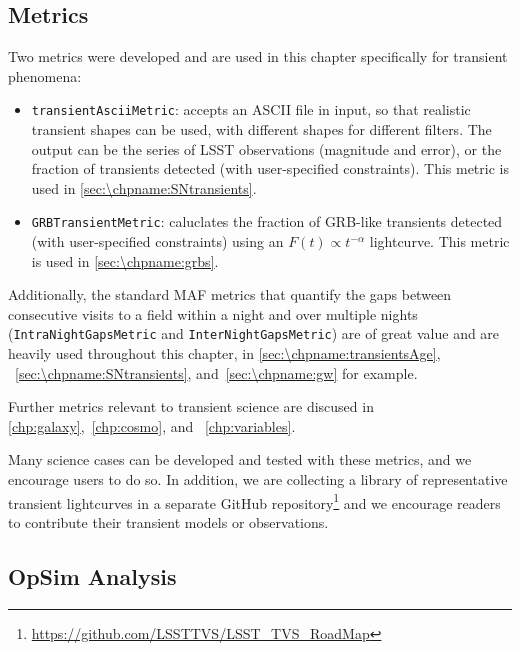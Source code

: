 
\subsection{Metrics}
\label{sec:\chpname:metrics}

Two metrics were developed and are used in this chapter specifically for transient phenomena:
\begin{itemize}
  \item{\texttt{transientAsciiMetric}: accepts an ASCII file in input, so that realistic transient shapes can be used, with different shapes for different filters. The output can be the series of LSST observations (magnitude and error), or the fraction of transients detected (with user-specified constraints). This metric is used in \autoref{sec:\chpname:SNtransients}.}
  \item{\texttt{GRBTransientMetric}: caluclates the fraction of GRB-like transients detected (with user-specified constraints) using an $F(t) \propto t^{-\alpha}$
    lightcurve. This metric is used in \autoref{sec:\chpname:grbs}}.
\end{itemize}

Additionally, the standard MAF metrics
that quantify the gaps between consecutive visits to
a field within a night and over multiple nights
(\texttt{IntraNightGapsMetric} and \texttt{InterNightGapsMetric})
are of great value and are
heavily used throughout this chapter, in \autoref{sec:\chpname:transientsAge},
~\autoref{sec:\chpname:SNtransients}, and~\autoref{sec:\chpname:gw} for example.

Further metrics relevant to transient science are discused in \autoref{chp:galaxy},~\autoref{chp:cosmo}, and ~\autoref{chp:variables}.

Many science cases can be developed and tested with these metrics, and we
encourage users to do so. In addition, we are collecting a library of representative transient lightcurves in a separate GitHub repository\footnote{\url{https://github.com/LSSTTVS/LSST_TVS_RoadMap}} and we encourage readers to contribute their transient models or observations.



\subsection{OpSim Analysis}
\label{sec:\chpname:analysis}

